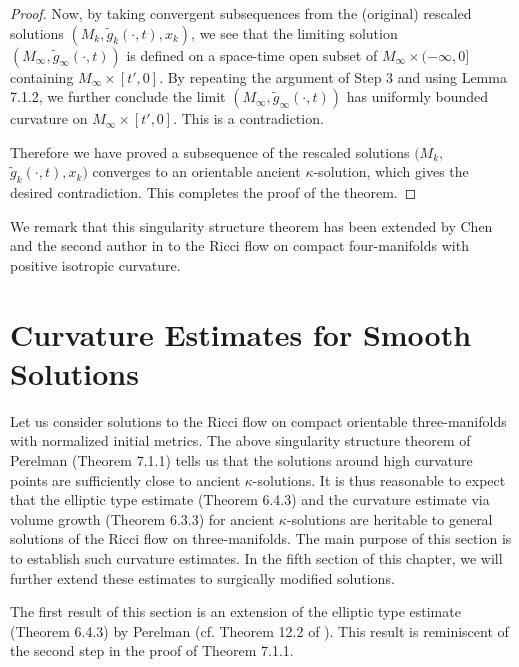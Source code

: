 \begin{proof}
Now, by taking convergent subsequences from the (original)
rescaled solutions $(M_k,\tilde{g}_k(\cdot,t),x_k)$, we see that
the limiting solution $(M_{\infty},\tilde{g}_{\infty}(\cdot,t))$
is defined on a space-time open subset of $M_{\infty} \times
(-\infty,0]$ containing $M_{\infty} \times [t',0]$. By repeating
the argument of Step 3 and using Lemma 7.1.2, we further conclude
the limit $(M_{\infty},\tilde{g}_{\infty}(\cdot,t))$ has uniformly
bounded curvature on $M_{\infty} \times [t',0]$. This is a
contradiction.

Therefore we have proved a subsequence of the rescaled solutions
$(M_k,$ $\tilde{g}_k(\cdot,t),x_k)$ converges to an orientable
ancient $\kappa$-solution, which gives the desired contradiction.
This completes the proof of the theorem.
\end{proof}

We remark that this singularity structure theorem has been
extended by Chen and the second author in \cite{CZ05F} to the
Ricci flow on compact four-manifolds with positive isotropic
curvature.


\section{Curvature Estimates for Smooth Solutions}

Let us consider solutions to the Ricci flow on compact orientable
three-manifolds with normalized initial metrics. The above
singularity structure theorem of Perelman (Theorem 7.1.1) tells us
that the solutions around high curvature points are sufficiently
close to ancient $\kappa$-solutions. It is thus reasonable to
expect that the elliptic type estimate (Theorem 6.4.3) and the
curvature estimate via volume growth (Theorem 6.3.3) for ancient
$\kappa$-solutions are heritable to general solutions of the Ricci
flow on three-manifolds. The main purpose of this section is to
establish such curvature estimates. In the fifth section of this
chapter, we will further extend these estimates to surgically
modified solutions.

The first result of this section is an extension of the elliptic
type estimate (Theorem 6.4.3) by Perelman (cf. Theorem 12.2 of
\cite{P1}). This result is reminiscent of the second step in the
proof of Theorem 7.1.1.

